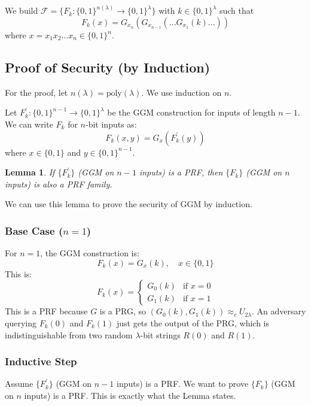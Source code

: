 \documentclass[11pt, a4paper]{article}
\newcommand{\poly}{\text{poly}}
\newtheorem{lem}{Lemma}
\begin{document}
We build $\mathcal{F}=\{F_{k}:\{0,1\}^{n(\lambda)}\rightarrow\{0,1\}^{\lambda}\}$ with $k \in \{0,1\}^{\lambda}$ such that 
$$ F_{k}(x)=G_{x_{n}}(G_{x_{n-1}}(...G_{x_{1}}(k)...)) $$ 
where $x = x_1x_2...x_n \in \{0,1\}^n$.

\subsection*{Proof of Security (by Induction)}

For the proof, let $n(\lambda) = \poly(\lambda)$. We use induction on $n$. 

Let $F_{k}^{'}:\{0,1\}^{n-1}\rightarrow\{0,1\}^{\lambda}$ be the GGM construction for inputs of length $n-1$. 
We can write $F_k$ for $n$-bit inputs as:
$$ F_{k}(x,y)=G_{x}(F_{k}^{'}(y)) $$ 
where $x\in\{0,1\}$ and $y\in\{0,1\}^{n-1}$. 

\begin{lem} 
If $\{F_{k}^{'}\}$ (GGM on $n-1$ inputs) is a PRF, then $\{F_k\}$ (GGM on $n$ inputs) is also a PRF family. 
\end{lem}

We can use this lemma to prove the security of GGM by induction. 

\subsubsection*{Base Case ($n=1$)} 
For $n=1$, the GGM construction is: 
$$ F_{k}(x)=G_{x}(k), \quad x \in \{0,1\} $$ 
This is:
$$ F_k(x) = \begin{cases} G_0(k) & \text{if } x=0 \\ G_1(k) & \text{if } x=1 \end{cases} $$ 
This is a PRF because $G$ is a PRG, so $(G_{0}(k),G_{1}(k))\approx_{c}U_{2\lambda}$. An adversary querying $F_k(0)$ and $F_k(1)$ just gets the output of the PRG, which is indistinguishable from two random $\lambda$-bit strings $R(0)$ and $R(1)$.

\subsubsection*{Inductive Step}
Assume $\{F_{k}^{'}\}$ (GGM on $n-1$ inputs) is a PRF. We want to prove $\{F_k\}$ (GGM on $n$ inputs) is a PRF. This is exactly what the Lemma states. 
\end{document}
